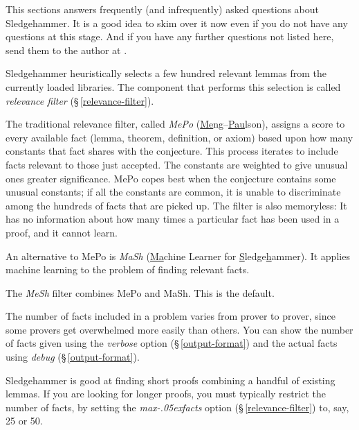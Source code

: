\documentclass[a4paper,12pt]{article}
\let\oldS=\S
\def\S{\oldS\,}
\renewcommand\_{\hbox{\textunderscore\kern-.05ex}}
\begin{document}
This sections answers frequently (and infrequently) asked questions about
Sledgehammer. It is a good idea to skim over it now even if you do not have any
questions at this stage. And if you have any further questions not listed here,
send them to the author at \authoremail.



Sledgehammer heuristically selects a few hundred relevant lemmas from the
currently loaded libraries. The component that performs this selection is
called \emph{relevance filter} (\S\ref{relevance-filter}).

\begin{enum}
\item[\labelitemi]
The traditional relevance filter, called \emph{MePo}
(\underline{Me}ng--\underline{Pau}lson), assigns a score to every available fact
(lemma, theorem, definition, or axiom) based upon how many constants that fact
shares with the conjecture. This process iterates to include facts relevant to
those just accepted. The constants are weighted to give unusual ones greater
significance. MePo copes best when the conjecture contains some unusual
constants; if all the constants are common, it is unable to discriminate among
the hundreds of facts that are picked up. The filter is also memoryless: It has
no information about how many times a particular fact has been used in a proof,
and it cannot learn.

\item[\labelitemi]
An alternative to MePo is \emph{MaSh} (\underline{Ma}chine Learner for
\underline{S}ledge\underline{h}ammer). It applies machine learning to the
problem of finding relevant facts.

\item[\labelitemi] The \emph{MeSh} filter combines MePo and MaSh. This is
the default.
\end{enum}

The number of facts included in a problem varies from prover to prover, since
some provers get overwhelmed more easily than others. You can show the number of
facts given using the \textit{verbose} option (\S\ref{output-format}) and the
actual facts using \textit{debug} (\S\ref{output-format}).

Sledgehammer is good at finding short proofs combining a handful of existing
lemmas. If you are looking for longer proofs, you must typically restrict the
number of facts, by setting the \textit{max\_facts} option
(\S\ref{relevance-filter}) to, say, 25 or 50.
\end{document}
